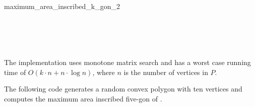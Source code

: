 \begin{ccRefFunction}{maximum_area_inscribed_k_gon_2}
  \ccSeeAlso
  \\
  \\
  \\
  \\
  \\
  
  \ccImplementation The implementation uses monotone matrix search
  \cite{akmsw-gamsa-87} and has a worst case running time of $O(k
  \cdot n + n \cdot \log n)$, where $n$ is the number of vertices in
  $P$.

  \ccExample The following code generates a random convex polygon
   with ten vertices and computes the maximum area inscribed
  five-gon of .


\end{ccRefFunction}

